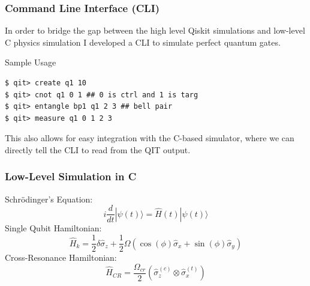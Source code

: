 \documentclass{beamer}
\begin{document}

\begin{frame}[fragile]
\frametitle{Command Line Interface (CLI)}
In order to bridge the gap between the high level Qiskit simulations and low-level C physics simulation I developed a CLI to simulate perfect quantum gates.
\begin{exampleblock}{Sample Usage}
\begin{verbatim}
$ qit> create q1 10 
$ qit> cnot q1 0 1 ## 0 is ctrl and 1 is targ
$ qit> entangle bp1 q1 2 3 ## bell pair
$ qit> measure q1 0 1 2 3
\end{verbatim}
\end{exampleblock}
This also allows for easy integration with the C-based simulator, where we can directly tell the CLI to read from the QIT output.
\end{frame}

\begin{frame}
\frametitle{Low-Level Simulation in C}

Schrödinger's Equation:
\[ i \frac{d}{dt} |\psi(t)\rangle = \hat{H}(t) |\psi(t)\rangle \]
Single Qubit Hamiltonian:
\[ \hat{H}_{k} = \frac{1}{2} \delta \hat{\sigma}_z + \frac{1}{2} \Omega ( \cos(\phi) \hat{\sigma}_x + \sin(\phi) \hat{\sigma}_y ) \]
Cross-Resonance Hamiltonian:
\[ \hat{H}_{CR} = \frac{\Omega_{cr}}{2} ( \hat{\sigma}_z^{(c)} \otimes \hat{\sigma}_x^{(t)} ) \]


\end{frame}
\end{document}
